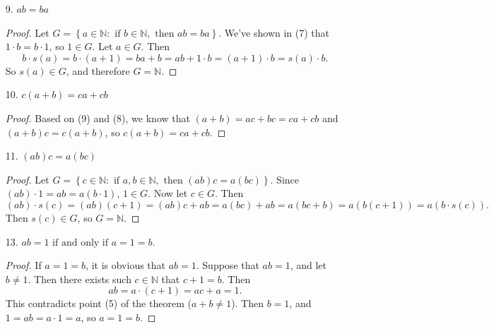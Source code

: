 \documentclass{article}
\newcommand{\N}{\mathbb{N}}
\begin{document}
\begin{enumerate}
\begin{proof}
		Let $c \in \N$. Then \[(a + b) \cdot s(c) = (a + b) \cdot c + (a + b) = ac + bc + a + b = (ac + a) + (bc + b) = a \cdot s(c) + b \cdot s(c).\] So $s(c) \in G$, and therefore $G = \N$.
	\end{proof}
	\item[9. ] $ab = ba$
	\begin{proof}
		Let $G = \left\{a \in \N: \text{ if } b \in \N, \text{ then }ab = ba\right\}$. We've shown in (7) that $1 \cdot b = b \cdot 1$, so $1 \in G$. Let $a \in G$. Then \[ b \cdot s(a) = b \cdot (a + 1) = ba + b = ab + 1 \cdot b = (a + 1) \cdot b = s(a) \cdot b. \] So $s(a) \in G$, and therefore $G = \N$.
	\end{proof}
	\item[10. ] $c(a + b) = ca + cb$
	\begin{proof}
		Based on (9) and (8), we know that $(a + b) = ac + bc = ca + cb$ and $(a + b)c = c(a + b)$, so $c(a + b) = ca + cb$.
	\end{proof}
	\item[11. ] $(ab)c = a(bc)$
	\begin{proof}
		Let $G = \left\{c \in \N: \text{ if } a,b \in \N, \text{ then } (ab)c = a(bc)\right\}$. Since $(ab)\cdot 1 = ab = a(b \cdot 1)$, $1 \in G$. Now let $c \in G$. Then \[ (ab)\cdot s(c) = (ab)(c + 1) = (ab)c + ab = a(bc) + ab = a(bc + b) = a(b(c + 1)) = a(b \cdot s(c)). \] Then $s(c) \in G$, so $G = \N$.
	\end{proof}
	\item[13. ] $ab = 1 \text{ if and only if } a = 1 = b$.
	\begin{proof}
		If $a = 1 = b$, it is obvious that $ab = 1$. Suppose that $ab = 1$, and let $b \ne 1$. Then there exists such $c \in \N$ that $c + 1 = b$. Then \[ab = a \cdot (c + 1) = ac + a = 1. \] This contradicts point (5) of the theorem ($a + b \ne 1$). Then $b = 1$, and $1 = ab = a \cdot 1 = a$, so $a = 1 = b$.
	\end{proof}
\end{enumerate}
\end{document}
